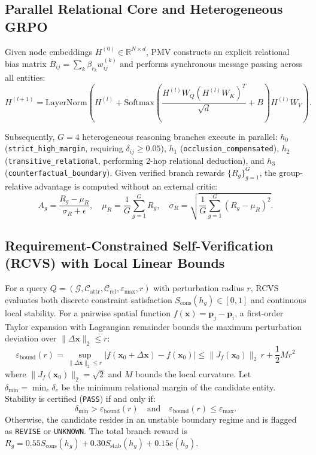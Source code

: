 \documentclass[10pt,twocolumn]{article}
\begin{document}
\subsection{Parallel Relational Core and Heterogeneous GRPO}
Given node embeddings $H^{(0)} \in \mathbb{R}^{N \times d}$, PMV constructs an explicit relational bias matrix $B_{ij} = \sum_{k} \beta_{r_k} w_{ij}^{(k)}$ and performs synchronous message passing across all entities:
\begin{equation}
    H^{(l+1)} = \text{LayerNorm}\!\left(H^{(l)} + \text{Softmax}\!\left(\frac{H^{(l)}W_Q (H^{(l)}W_K)^T}{\sqrt{d}} + B\right)\!H^{(l)}W_V\right).
\end{equation}

Subsequently, $G=4$ heterogeneous reasoning branches execute in parallel: $h_0$ (\texttt{strict\_high\_margin}, requiring $\delta_{ij} \ge 0.05$), $h_1$ (\texttt{occlusion\_compensated}), $h_2$ (\texttt{transitive\_relational}, performing 2-hop relational deduction), and $h_3$ (\texttt{counterfactual\_boundary}). Given verified branch rewards $\{R_g\}_{g=1}^G$, the group-relative advantage is computed without an external critic:
\begin{equation}
    A_g = \frac{R_g - \mu_R}{\sigma_R + \epsilon}, \quad \mu_R = \frac{1}{G}\sum_{g=1}^G R_g, \quad \sigma_R = \sqrt{\frac{1}{G}\sum_{g=1}^G (R_g - \mu_R)^2}.
\end{equation}

\subsection{Requirement-Constrained Self-Verification (RCVS) with Local Linear Bounds}
For a query $Q = (\mathcal{G}, \mathcal{C}_{\text{attr}}, \mathcal{C}_{\text{rel}}, \varepsilon_{\max}, r)$ with perturbation radius $r$, RCVS evaluates both discrete constraint satisfaction $S_{\text{cons}}(h_g) \in [0,1]$ and continuous local stability. For a pairwise spatial function $f(\mathbf{x}) = \mathbf{p}_j - \mathbf{p}_i$, a first-order Taylor expansion with Lagrangian remainder bounds the maximum perturbation deviation over $\|\Delta \mathbf{x}\|_2 \le r$:
\begin{equation}
    \varepsilon_{\text{bound}}(r) = \sup_{\|\Delta \mathbf{x}\|_2 \le r} |f(\mathbf{x}_0 + \Delta \mathbf{x}) - f(\mathbf{x}_0)| \le \|J_f(\mathbf{x}_0)\|_2 \, r + \frac{1}{2} M r^2
\end{equation}
where $\|J_f(\mathbf{x}_0)\|_2 = \sqrt{2}$ and $M$ bounds the local curvature. Let $\delta_{\min} = \min_{e} \delta_e$ be the minimum relational margin of the candidate entity. Stability is certified (\texttt{PASS}) if and only if:
\begin{equation}
    \delta_{\min} > \varepsilon_{\text{bound}}(r) \quad \text{and} \quad \varepsilon_{\text{bound}}(r) \le \varepsilon_{\max}.
\end{equation}
Otherwise, the candidate resides in an unstable boundary regime and is flagged as \texttt{REVISE} or \texttt{UNKNOWN}. The total branch reward is $R_g = 0.55 S_{\text{cons}}(h_g) + 0.30 S_{\text{stab}}(h_g) + 0.15 c(h_g)$.
\end{document}

